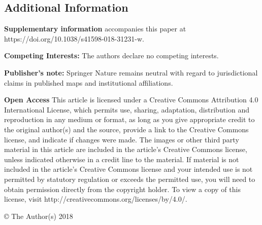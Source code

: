 \documentclass{article}
\begin{document}
\subsection*{Additional Information}
\noindent\textbf{Supplementary information} accompanies this paper at https://doi.org/10.1038/s41598-018-31231-w.

\noindent\textbf{Competing Interests:} The authors declare no competing interests.

\noindent\textbf{Publisher's note:} Springer Nature remains neutral with regard to jurisdictional claims in published maps and institutional affiliations.

\noindent\textbf{Open Access} This article is licensed under a Creative Commons Attribution 4.0 International License, which permits use, sharing, adaptation, distribution and reproduction in any medium or format, as long as you give appropriate credit to the original author(s) and the source, provide a link to the Creative Commons license, and indicate if changes were made. The images or other third party material in this article are included in the article’s Creative Commons license, unless indicated otherwise in a credit line to the material. If material is not included in the article’s Creative Commons license and your intended use is not permitted by statutory regulation or exceeds the permitted use, you will need to obtain permission directly from the copyright holder. To view a copy of this license, visit http://creativecommons.org/licenses/by/4.0/.

\noindent © The Author(s) 2018
\end{document}
